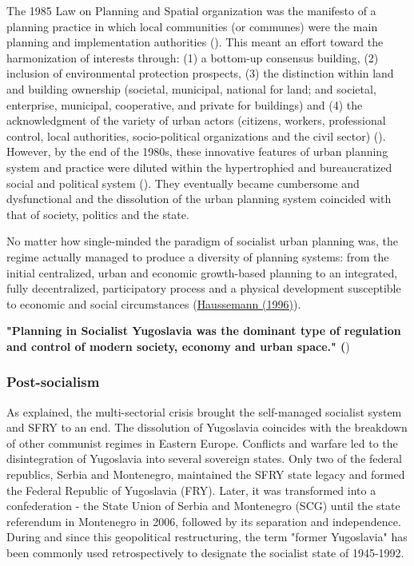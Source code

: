 \documentclass[11pt]{report}
\begin{document}
\begin{enumerate}
The 1985 Law on Planning and Spatial organization was the manifesto of a planning practice in which local communities (or communes) were the main planning and implementation authorities (\href{Vujosevic}{\citealt{vujosevic_planning_2006}}). This meant an effort toward the harmonization of interests through: (1) a bottom-up consensus building, (2) inclusion of environmental protection prospects, (3) the distinction within land and building ownership (societal, municipal, national for land; and societal, enterprise, municipal, cooperative, and private for buildings) and (4) the acknowledgment of the variety of urban actors (citizens, workers, professional control, local authorities, socio-political organizations and the civil sector) (\href{Nedovic}{\citealt{nedovic-budic_adjustment_2001}}).
However, by the end of the 1980s, these innovative features of urban planning system and practice were diluted within the hypertrophied and bureaucratized social and political system (\href{Peric}{\cite{peric_evolution_2016}}). They eventually became cumbersome and dysfunctional and the dissolution of the urban planning system coincided with that of society, politics and the state.
\end{enumerate}

No matter how single-minded the paradigm of socialist urban planning was, the regime actually managed to produce a diversity of planning systems:  from the initial centralized, urban and economic growth-based planning to an integrated, fully decentralized, participatory process and a physical development susceptible to economic and social circumstances (\href{Haussemann}{Haussemann (1996)}).

\textbf{"Planning  in  Socialist  Yugoslavia  was  the  dominant  type  of  regulation  and  control  of  modern  society, economy and urban space." (\href{Vukmirovic}{\citealt{vukmirovic_city_2013}}})

\subsubsection{Post-socialism}

As explained, the multi-sectorial crisis brought the self-managed socialist system and SFRY to an end. The dissolution of Yugoslavia coincides with the breakdown of other communist regimes in Eastern Europe. Conflicts and warfare led to the disintegration of Yugoslavia into several sovereign states. Only two of the federal republics, Serbia and Montenegro, maintained the SFRY state legacy and formed the Federal Republic of Yugoslavia (FRY). Later, it was transformed into a confederation - the State Union of Serbia and Montenegro (SCG) until the state referendum in Montenegro in 2006, followed by its separation and independence. During and since this geopolitical restructuring, the term "former Yugoslavia" has been commonly used retrospectively to designate the socialist state of 1945-1992.
\\
\end{document}
